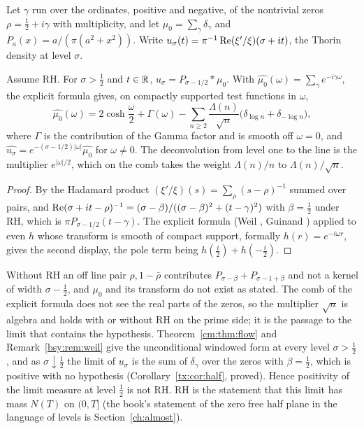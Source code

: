 Let $\gamma$ run over the ordinates, positive and negative, of the nontrivial zeros $\rho=\frac12+i\gamma$ with multiplicity, and let $\mu_0=\sum_\gamma\delta_\gamma$ and $P_a(x)=a/(\pi(a^2+x^2))$. Write $u_\sigma(t)=\pi^{-1}\operatorname{Re}(\xi'/\xi)(\sigma+it)$, the Thorin density at level $\sigma$.

\begin{proposition}[conditional on RH]\label{bk:prop:cauchy}
Assume RH. For $\sigma>\frac12$ and $t\in\mathbb{R}$, $u_\sigma=P_{\sigma-1/2}*\mu_0$. With $\widehat{\mu_0}(\omega)=\sum_\gamma e^{-i\gamma\omega}$, the explicit formula gives, on compactly supported test functions in $\omega$,
\[
\widehat{\mu_0}(\omega)=2\cosh\frac\omega2+\Gamma(\omega)-\sum_{n\ge2}\frac{\Lambda(n)}{\sqrt n}\big(\delta_{\log n}+\delta_{-\log n}\big),
\]
where $\Gamma$ is the contribution of the Gamma factor and is smooth off $\omega=0$, and $\widehat{u_\sigma}=e^{-(\sigma-1/2)|\omega|}\widehat{\mu_0}$ for $\omega\ne0$. The deconvolution from level one to the line is the multiplier $e^{|\omega|/2}$, which on the comb takes the weight $\Lambda(n)/n$ to $\Lambda(n)/\sqrt n$.
\end{proposition}

\begin{proof}
By the Hadamard product $(\xi'/\xi)(s)=\sum_\rho(s-\rho)^{-1}$ summed over pairs, and $\operatorname{Re}(\sigma+it-\rho)^{-1}=(\sigma-\beta)/((\sigma-\beta)^2+(t-\gamma)^2)$ with $\beta=\frac12$ under RH, which is $\pi P_{\sigma-1/2}(t-\gamma)$. The explicit formula (Weil \cite{Weil52}, Guinand \cite{Guinand48}) applied to even $h$ whose transform is smooth of compact support, formally $h(r)=e^{-i\omega r}$, gives the second display, the pole term being $h(\frac i2)+h(-\frac i2)$.
\end{proof}

Without RH an off line pair $\rho,1-\bar\rho$ contributes $P_{\sigma-\beta}+P_{\sigma-1+\beta}$ and not a kernel of width $\sigma-\frac12$, and $\mu_0$ and its transform do not exist as stated. The comb of the explicit formula does not see the real parts of the zeros, so the multiplier $\sqrt n$ is algebra and holds with or without RH on the prime side; it is the passage to the limit that contains the hypothesis. Theorem~\ref{cm:thm:flow} and Remark~\ref{bsy:rem:weil} give the unconditional windowed form at every level $\sigma>\frac12$, and as $\sigma\downarrow\frac12$ the limit of $u_\sigma$ is the sum of $\delta_\gamma$ over the zeros with $\beta=\frac12$, which is positive with no hypothesis (Corollary~\ref{tx:cor:half}, proved). Hence positivity of the limit measure at level $\frac12$ is not RH. RH is the statement that this limit has mass $N(T)$ on $(0,T]$ (the book's statement of the zero free half plane in the language of levels is Section~\ref{ch:almost}).
